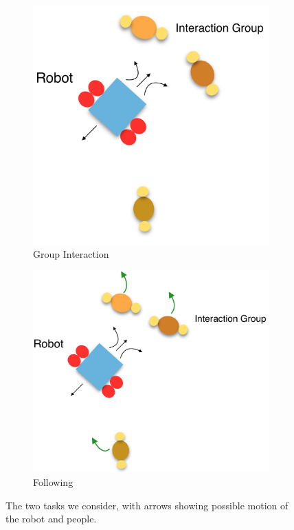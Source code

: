 \documentclass[letterpaper, 10 pt, conference]{ieeeconf}
\begin{document}
	\begin{figure}[tbh]
	\centering
      \begin{subfigure}[b]{0.39\columnwidth}
    \includegraphics[scale = 0.15]{images/static.png}
    \caption{Group Interaction}
    \label{fig:static}
  \end{subfigure}
  \hspace{10mm}
  \begin{subfigure}[b]{0.39\columnwidth}
  \hspace{4mm}
    \includegraphics[scale = 0.15]{images/follow.png}
    \caption{Following}
    \label{fig:follow}
  \end{subfigure} 
  \caption{The two tasks we consider, with arrows showing possible motion of the robot and people.}


\end{figure}
\end{document}
